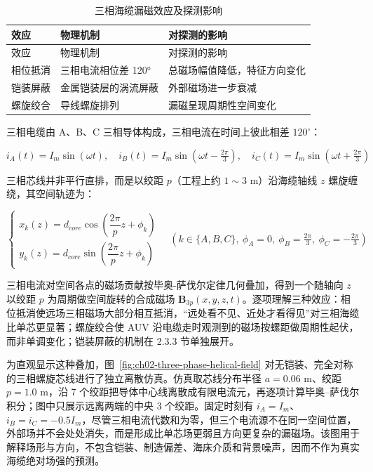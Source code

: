 \begin{longtable}[]{@{}lll@{}}
\caption{三相海缆漏磁效应及探测影响}\label{tab:ch02-magnetic-effects}\tabularnewline
\toprule\noalign{}
效应 & 物理机制 & 对探测的影响 \\
\midrule\noalign{}
\endfirsthead
\toprule\noalign{}
效应 & 物理机制 & 对探测的影响 \\
\midrule\noalign{}
\endhead
\bottomrule\noalign{}
\endlastfoot
相位抵消 & 三相电流相位差 120° & 总磁场幅值降低，特征方向变化 \\
铠装屏蔽 & 金属铠装层的涡流屏蔽 & 外部磁场进一步衰减 \\
螺旋绞合 & 导线螺旋排列 & 漏磁呈现周期性空间变化 \\
\end{longtable}

三相电缆由 A、B、C 三相导体构成，三相电流在时间上彼此相差 \(120^\circ\)：

\begin{equation}
i_A(t) = I_m \sin(\omega t), \quad i_B(t) = I_m \sin\!\left(\omega t - \tfrac{2\pi}{3}\right), \quad i_C(t) = I_m \sin\!\left(\omega t + \tfrac{2\pi}{3}\right)
\label{eq:ch02-three-phase-current}
\end{equation}

三相芯线并非平行直排，而是以绞距 \(p\)（工程上约 \(1\sim3\text{ m}\)）沿海缆轴线 \(z\) 螺旋缠绕，其空间轨迹为：

\begin{equation}
\begin{cases} x_k(z) = d_{core}\cos\!\left(\dfrac{2\pi}{p}z + \phi_k\right) \\[4pt] y_k(z) = d_{core}\sin\!\left(\dfrac{2\pi}{p}z + \phi_k\right) \end{cases} \quad (k \in \{A,B,C\},\ \phi_A = 0,\ \phi_B = \tfrac{2\pi}{3},\ \phi_C = -\tfrac{2\pi}{3})
\label{eq:ch02-helix-path}
\end{equation}

三相电流对空间各点的磁场贡献按毕奥-萨伐尔定律几何叠加，得到一个随轴向 \(z\) 以绞距 \(p\) 为周期做空间旋转的合成磁场 \(\boldsymbol{B}_{3p}(x,y,z,t)\)。逐项理解三种效应：相位抵消使远场三相磁场大部分相互抵消，``远处看不见、近处才看得见''对三相海缆比单芯更显著；螺旋绞合使 AUV 沿电缆走时观测到的磁场按螺距做周期性起伏，而非单调变化；铠装屏蔽的机制在 2.3.3 节单独展开。

为直观显示这种叠加，图~\ref{fig:ch02-three-phase-helical-field} 对无铠装、完全对称的三相螺旋芯线进行了独立离散仿真。仿真取芯线分布半径 \(a=0.06\text{ m}\)、绞距 \(p=1.0\text{ m}\)，沿 7 个绞距把导体中心线离散成有限电流元，再逐项计算毕奥--萨伐尔积分；图中只展示远离两端的中央 3 个绞距。固定时刻有 \(i_A=I_m\)、\(i_B=i_C=-0.5I_m\)，尽管三相电流代数和为零，但三个电流源不在同一空间位置，外部场并不会处处消失，而是形成比单芯场更弱且方向更复杂的漏磁场。该图用于解释场形与方向，不包含铠装、制造偏差、海床介质和背景噪声，因而不作为真实海缆绝对场强的预测。

